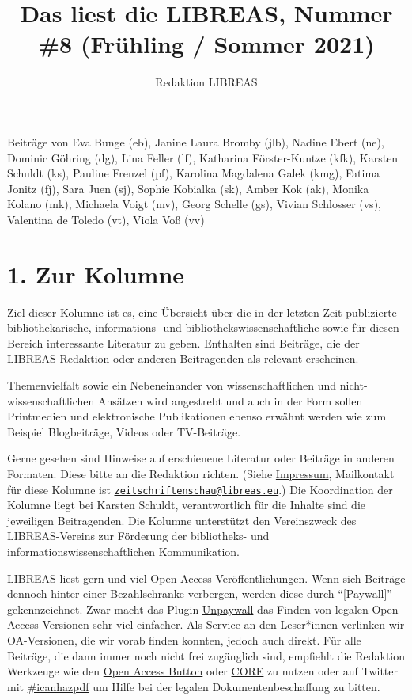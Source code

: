 \documentclass[a4paper,
fontsize=11pt,
oneside,
numbers=noperiodatend,
parskip=half-,
bibliography=totoc,
final
]{scrartcl}
\title{\LARGE{Das liest die LIBREAS, Nummer \#8 (Frühling / Sommer 2021)}}%
\author{Redaktion LIBREAS} %
\date{}
\begin{document}
\maketitle
\thispagestyle{fancyplain} 


Beiträge von Eva Bunge (eb), Janine Laura Bromby (jlb), Nadine Ebert
(ne), Dominic Göhring (dg), Lina Feller (lf), Katharina Förster-Kuntze
(kfk), Karsten Schuldt (ks), Pauline Frenzel (pf), Karolina Magdalena
Galek (kmg), Fatima Jonitz (fj), Sara Juen (sj), Sophie Kobialka (sk),
Amber Kok (ak), Monika Kolano (mk), Michaela Voigt (mv), Georg Schelle
(gs), Vivian Schlosser (vs), Valentina de Toledo (vt), Viola Voß (vv)

\hypertarget{zur-kolumne}{%
\section{1. Zur Kolumne}\label{zur-kolumne}}

Ziel dieser Kolumne ist es, eine Übersicht über die in der letzten Zeit
publizierte bibliothekarische, informations- und
bibliothekswissenschaftliche sowie für diesen Bereich interessante
Literatur zu geben. Enthalten sind Beiträge, die der LIBREAS-Redaktion
oder anderen Beitragenden als relevant erscheinen.

Themenvielfalt sowie ein Nebeneinander von wissenschaftlichen und
nicht-wissenschaftlichen Ansätzen wird angestrebt und auch in der Form
sollen Printmedien und elektronische Publikationen ebenso erwähnt werden
wie zum Beispiel Blogbeiträge, Videos oder TV-Beiträge.

Gerne gesehen sind Hinweise auf erschienene Literatur oder Beiträge in
anderen Formaten. Diese bitte an die Redaktion richten. (Siehe
\href{http://libreas.eu/about/}{Impressum}, Mailkontakt für diese
Kolumne ist
\href{mailto:zeitschriftenschau@libreas.eu}{\nolinkurl{zeitschriftenschau@libreas.eu}}.)
Die Koordination der Kolumne liegt bei Karsten Schuldt, verantwortlich
für die Inhalte sind die jeweiligen Beitragenden. Die Kolumne
unterstützt den Vereinszweck des LIBREAS-Vereins zur Förderung der
bibliotheks- und informationswissenschaftlichen Kommunikation.

LIBREAS liest gern und viel Open-Access-Veröffentlichungen. Wenn sich
Beiträge dennoch hinter einer Bezahlschranke verbergen, werden diese
durch \enquote{{[}Paywall{]}} gekennzeichnet. Zwar macht das Plugin
\href{http://unpaywall.org/}{Unpaywall} das Finden von legalen
Open-Access-Versionen sehr viel einfacher. Als Service an den
Leser*innen verlinken wir OA-Versionen, die wir vorab finden konnten,
jedoch auch direkt. Für alle Beiträge, die dann immer noch nicht frei
zugänglich sind, empfiehlt die Redaktion Werkzeuge wie den
\href{https://openaccessbutton.org/}{Open Access Button} oder
\href{https://core.ac.uk/services/discovery/}{CORE} zu nutzen oder auf
Twitter mit
\href{https://twitter.com/hashtag/icanhazpdf?src=hash}{\#icanhazpdf} um
Hilfe bei der legalen Dokumentenbeschaffung zu bitten.
\end{document}
